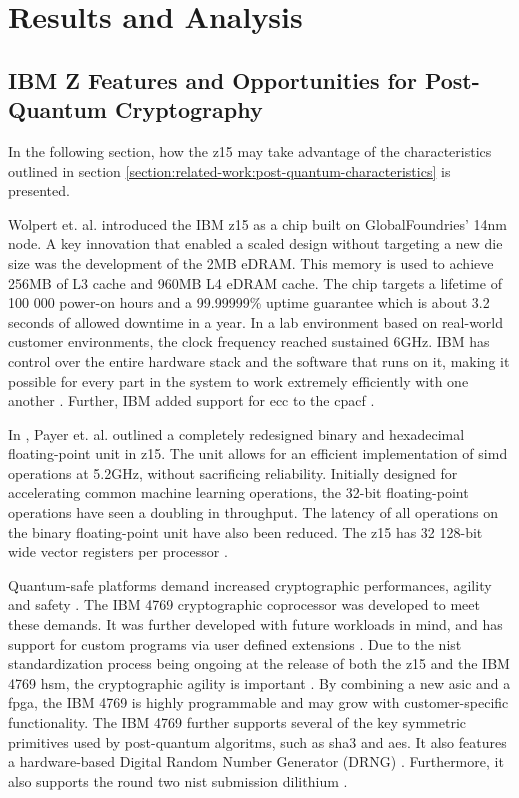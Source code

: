 \chapter{Results and Analysis}
\label{chapter:results}

\section{IBM Z Features and Opportunities for Post-Quantum Cryptography}
\label{section:results:z15}

In the following section, how the \gls{z15} may take advantage of the characteristics outlined in section \ref{section:related-work:post-quantum-characteristics} is presented.

Wolpert et. al. \cite{wolpert2020} introduced the IBM \gls{z15} as a chip built on GlobalFoundries' 14nm node. A key innovation that enabled a scaled design without targeting a new die size was the development of the 2MB eDRAM. This memory is used to achieve 256MB of L3 cache and 960MB L4 eDRAM cache. The chip targets a lifetime of 100 000 power-on hours and a 99.99999\% uptime guarantee which is about 3.2 seconds of allowed downtime in a year. In a lab environment based on real-world customer environments, the clock frequency reached sustained 6GHz. IBM has control over the entire hardware stack and the software that runs on it, making it possible for every part in the system to work extremely efficiently with one another \cite{wolpert2020}. Further, IBM added support for \gls{ecc} to the \gls{cpacf} \cite{berry2020}.

In \cite{payer2020}, Payer et. al. outlined a completely redesigned binary and hexadecimal floating-point unit in \gls{z15}. The unit allows for an efficient implementation of \gls{simd} operations at 5.2GHz, without sacrificing reliability. Initially designed for accelerating common machine learning operations, the 32-bit floating-point operations have seen a doubling in throughput. The latency of all operations on the binary floating-point unit have also been reduced. The \gls{z15} has 32 128-bit wide vector registers per processor \cite{redbook:z15}.

Quantum-safe platforms demand increased cryptographic performances, agility and safety \cite{busby2020}. The IBM 4769 cryptographic coprocessor was developed to meet these demands. It was further developed with future workloads in mind, and has support for custom programs via user defined extensions \cite{busby2020, ibm:4769}. Due to the \gls{nist} standardization process being ongoing at the release of both the \gls{z15} and the IBM 4769 \gls{hsm}, the cryptographic agility is important \cite{microsoft2020, ibm:z15:2019}. By combining a new \gls{asic} and a \gls{fpga}, the IBM 4769 is highly programmable and may grow with customer-specific functionality. The IBM 4769 further supports several of the key symmetric primitives used by \gls{post-quantum} algoritms, such as \gls{sha3} and \gls{aes}. It also features a hardware-based Digital Random Number Generator (DRNG) \cite{ibm:4769:ep11}. Furthermore, it also supports the round two \gls{nist} submission \gls{dilithium} \cite{ibm:4769:ep11, busby2020}.

